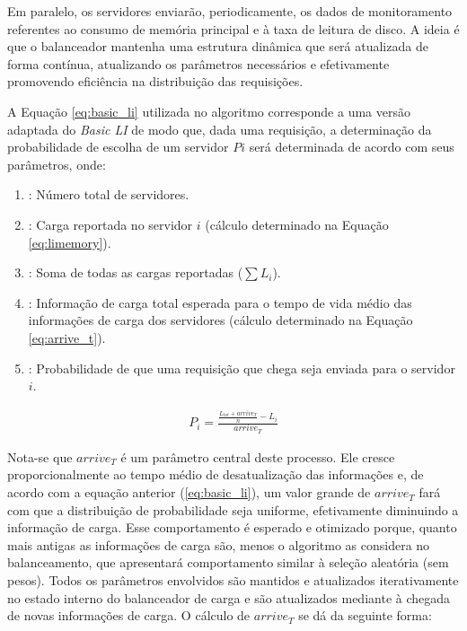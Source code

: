 Em paralelo, os servidores enviarão, periodicamente, os dados de monitoramento referentes ao consumo de memória principal e à taxa de leitura de disco. A ideia é que o balanceador mantenha uma estrutura dinâmica que será atualizada de forma contínua, atualizando os parâmetros necessários e efetivamente promovendo eficiência na distribuição das requisições.

A Equação \ref{eq:basic_li} utilizada no algoritmo corresponde a uma versão adaptada do \textit{Basic LI} \cite{interpretingStaleLoadInformation2000} de modo que, dada uma requisição, a determinação da probabilidade de escolha de um servidor $P{i}$ será determinada de acordo com seus parâmetros, onde:

\begin{enumerate}
    \item[$n$]: Número total de servidores.
    \item[$L_{i}$]: Carga reportada no servidor $i$ (cálculo determinado na Equação \ref{eq:limemory}). 
    \item[$L_{tot}$]: Soma de todas as cargas reportadas ($\sum L_i$). 
    \item[$arrive_T$]: Informação de carga total esperada para o tempo de vida médio das informações de carga dos servidores (cálculo determinado na Equação \ref{eq:arrive_t}).
    \item[$P_i$]: Probabilidade de que uma requisição que chega seja enviada para o servidor $i$. 
\end{enumerate}

\begin{gather} \label{eq:basic_li}
P_{i}=\frac{\frac{L_{tot}+arrive_{T}}{n}-L_{i}}{arrive_{T}}
\end{gather}

Nota-se que $arrive_T$ é um parâmetro central deste processo. Ele cresce proporcionalmente ao tempo médio de desatualização das informações e, de acordo com a equação anterior (\ref{eq:basic_li}), um valor grande de $arrive_T$ fará com que a distribuição de probabilidade seja uniforme, efetivamente diminuindo a informação de carga. Esse comportamento é esperado e otimizado porque, quanto mais antigas as informações de carga são, menos o algoritmo as considera no balanceamento, que apresentará comportamento similar à seleção aleatória (sem pesos). Todos os parâmetros envolvidos são mantidos e atualizados iterativamente no estado interno do balanceador de carga e são atualizados mediante à chegada de novas informações de carga. O cálculo de $arrive_T$ se dá da seguinte forma:

